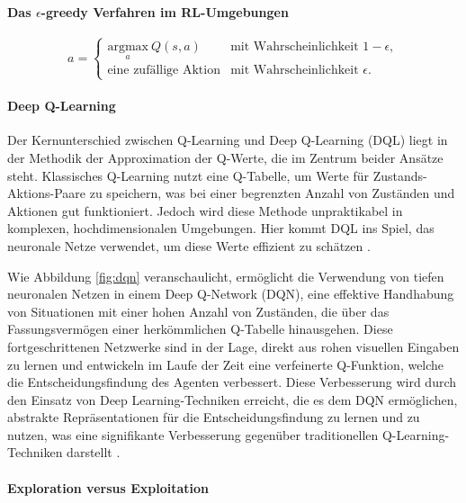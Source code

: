 \paragraph{Das $\epsilon$-greedy Verfahren im RL-Umgebungen}
\begin{equation}
		a = 
		\begin{cases}
				\underset{a}{\mathrm{argmax}}\ Q(s,a) & \text{mit Wahrscheinlichkeit } 1 - \epsilon, \\
				\text{eine zufällige Aktion} & \text{mit Wahrscheinlichkeit } \epsilon.
		\end{cases}
		\label{eq:epsilon_greedy}
\end{equation}


\paragraph{Deep Q-Learning}

Der Kernunterschied zwischen Q-Learning und Deep Q-Learning (DQL) liegt in der Methodik der Approximation der Q-Werte, die im Zentrum beider Ansätze steht. Klassisches Q-Learning nutzt eine Q-Tabelle, um Werte für Zustands-Aktions-Paare zu speichern, was bei einer begrenzten Anzahl von Zuständen und Aktionen gut funktioniert. Jedoch wird diese Methode unpraktikabel in komplexen, hochdimensionalen Umgebungen. Hier kommt DQL ins Spiel, das neuronale Netze verwendet, um diese Werte effizient zu schätzen \cite{morales2020grokking}. 

Wie Abbildung \ref{fig:dqn} veranschaulicht, ermöglicht die Verwendung von tiefen neuronalen Netzen in einem Deep Q-Network (DQN), eine effektive Handhabung von Situationen mit einer hohen Anzahl von Zuständen, die über das Fassungsvermögen einer herkömmlichen Q-Tabelle hinausgehen. Diese fortgeschrittenen Netzwerke sind in der Lage, direkt aus rohen visuellen Eingaben zu lernen und entwickeln im Laufe der Zeit eine verfeinerte Q-Funktion, welche die Entscheidungsfindung des Agenten verbessert. Diese Verbesserung wird durch den Einsatz von Deep Learning-Techniken erreicht, die es dem DQN ermöglichen, abstrakte Repräsentationen für die Entscheidungsfindung zu lernen und zu nutzen, was eine signifikante Verbesserung gegenüber traditionellen Q-Learning-Techniken darstellt \cite{brunton2019data}.


\paragraph{Exploration versus Exploitation}
\label{sec: Exploration versus Exploitation}

